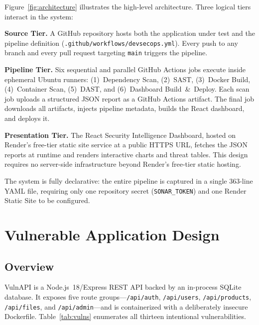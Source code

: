 \documentclass[10pt,conference]{IEEEtran}
\begin{document}
Figure~\ref{fig:architecture} illustrates the high-level architecture.
Three logical tiers interact in the system:

\textbf{Source Tier.} A GitHub repository hosts both the application under
test and the pipeline definition (\texttt{.github/workflows/devsecops.yml}).
Every push to any branch and every pull request targeting \texttt{main} triggers the
pipeline.

\textbf{Pipeline Tier.} Six sequential and parallel GitHub Actions jobs execute
inside ephemeral Ubuntu runners:
(1)~Dependency Scan, (2)~SAST, (3)~Docker Build, (4)~Container Scan,
(5)~DAST, and (6)~Dashboard Build~\&~Deploy.
Each scan job uploads a structured JSON report as a GitHub Actions artifact.
The final job downloads all artifacts, injects pipeline metadata, builds the
React dashboard, and deploys it.

\textbf{Presentation Tier.} The React Security Intelligence Dashboard, hosted
on Render's free-tier static site service at a public HTTPS URL,
fetches the JSON reports at runtime and renders interactive charts and threat
tables.
This design requires no server-side infrastructure beyond Render's free-tier
static hosting.

The system is fully declarative: the entire pipeline is captured in a
single 363-line YAML file, requiring only one repository secret
(\texttt{SONAR\_TOKEN}) and one Render Static Site to be configured.

\section{Vulnerable Application Design}

\subsection{Overview}

VulnAPI is a Node.js~18/Express REST API backed by an in-process SQLite
database.
It exposes five route groups—\texttt{/api/auth}, \texttt{/api/users},
\texttt{/api/products}, \texttt{/api/files}, and \texttt{/api/admin}—and is
containerized with a deliberately insecure Dockerfile.
Table~\ref{tab:vulns} enumerates all thirteen intentional vulnerabilities.
\end{document}
